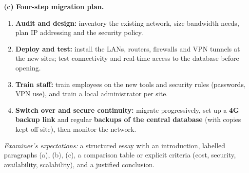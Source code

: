 \documentclass[11pt]{article}
\begin{document}
\begin{corrige}
\textbf{(c) Four-step migration plan.}
\begin{enumerate}
\item \textbf{Audit and design:} inventory the existing network, size bandwidth needs, plan IP addressing and the security policy.
\item \textbf{Deploy and test:} install the LANs, routers, firewalls and VPN tunnels at the new sites; test connectivity and real-time access to the database before opening.
\item \textbf{Train staff:} train employees on the new tools and security rules (passwords, VPN use), and train a local administrator per site.
\item \textbf{Switch over and secure continuity:} migrate progressively, set up a \textbf{4G backup link} and regular \textbf{backups of the central database} (with copies kept off-site), then monitor the network.
\end{enumerate}
\emph{Examiner's expectations:} a structured essay with an introduction, labelled paragraphs (a), (b), (c), a comparison table or explicit criteria (cost, security, availability, scalability), and a justified conclusion.
\end{corrige}
\end{document}
